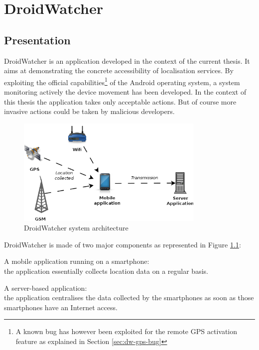 \chapter{DroidWatcher}
\label{chap:droidwatcher}

\section{Presentation}
\label{sec:dw-presentation}

DroidWatcher is an application developed in the context of the current thesis.
It aims at demonstrating the concrete accessibility of localisation services.
By exploiting the official capabilities\footnote{A known bug has however been exploited for the remote GPS activation feature as explained in Section \ref{sec:dw-gps-bug}} of the Android operating system, a system monitoring actively the device movement has been developed.
In the context of this thesis the application takes only acceptable actions.
But of course more invasive actions could be taken by malicious developers.

\begin{figure}[h]
  \centering
  \includegraphics[width=9cm]{images/dw-archi.png}
  \caption{DroidWatcher system architecture}
  \label{fig:dw-archi}
\end{figure}

DroidWatcher is made of two major components as represented in Figure \ref{fig:dw-archi}: 

\begin{itemizealt}
\item A mobile application running on a smartphone:\\
  the application essentially collects location data on a regular basis.
\item A server-based application:\\
  the application centralises the data collected by the smartphones as soon as those smartphones have an Internet access.
\end{itemizealt}

